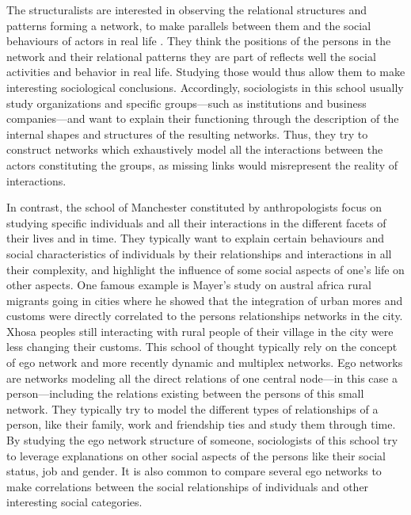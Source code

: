 The structuralists are interested in observing the relational structures and patterns forming a network, to make parallels between them and the social behaviours of actors in real life \cite{lazegaRéseauxSociauxStructures1998}.
They think the positions of the persons in the network and their relational patterns they are part of reflects well the social activities and behavior in real life.
Studying those would thus allow them to make interesting sociological conclusions.
Accordingly, sociologists in this school usually study organizations and specific groups---such as institutions and business companies---and want to explain their functioning through the description of the internal shapes and structures of the resulting networks.
Thus, they try to construct networks which exhaustively model all the interactions between the actors constituting the groups, as missing links would misrepresent the reality of interactions.

In contrast, the school of Manchester constituted by anthropologists focus on studying specific individuals and all their interactions in the different facets of their lives and in time.
They typically want to explain certain behaviours and social characteristics of individuals by their relationships and interactions in all their complexity,
and highlight the influence of some social aspects of one's life on other aspects.
One famous example is Mayer's study on austral africa rural migrants going in cities \cite{mayerMigrancyStudyAfricans1962} where he showed that the integration of urban mores and customs were directly correlated to the persons relationships networks in the city.
Xhosa peoples still interacting with rural people of their village in the city were less changing their customs.
This school of thought typically rely on the concept of ego network and more recently dynamic and multiplex networks.
Ego networks are networks modeling all the direct relations of one central node---in this case a person---including the relations existing between the persons of this small network.
They typically try to model the different types of relationships of a person, like their family, work and friendship ties and study them through time.
By studying the ego network structure of someone, sociologists of this school try to leverage explanations on other social aspects of the persons like their social status, job and gender.
It is also common to compare several ego networks to make correlations between the social relationships of individuals and other interesting social categories.


